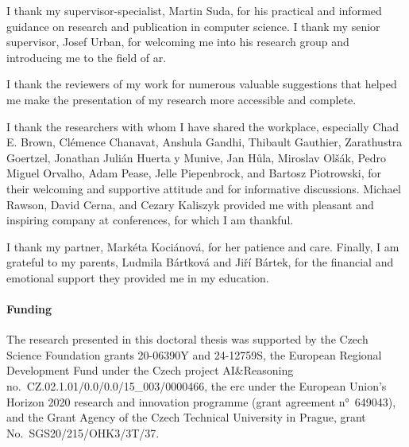\begin{thanks}
I thank my supervisor-specialist, Martin Suda, for his practical and informed guidance on research and publication in computer science.
I thank my senior supervisor, Josef Urban, for welcoming me into his research group and introducing me to the field of \gls{ar}.

I thank the reviewers of my work for numerous valuable suggestions that helped me make the presentation of my research more accessible and complete.

I thank the researchers with whom I have shared the workplace, especially
Chad E. Brown,
Clémence Chanavat,
Anshula Gandhi,
Thibault Gauthier,
Zarathustra Goertzel,
Jonathan Julián Huerta y Munive,
Jan Hůla,
Miroslav Olšák,
Pedro Miguel Orvalho,
Adam Pease,
Jelle Piepenbrock, and
Bartosz Piotrowski,
for their welcoming and supportive attitude and for informative discussions.
Michael Rawson, David Cerna, and Cezary Kaliszyk provided me with pleasant and inspiring company at conferences, for which I am thankful.

I thank my partner, Markéta Kociánová, for her patience and care.
Finally, I am grateful to my parents, Ludmila Bártková and Jiří Bártek, for the financial and emotional support they provided me in my education.

\paragraph{Funding}



The research presented in this doctoral thesis was supported by
the Czech Science Foundation grants 20-06390Y and 24-12759S,
the European Regional Development Fund under the Czech project AI\&Reasoning no.~CZ.02.1.01/0.0/0.0/15\_003/0000466,
the \gls{erc} under the European Union's Horizon 2020 research and innovation programme (grant agreement n°~649043), and
the Grant Agency of the Czech Technical University in Prague, grant No.~SGS20/215/OHK3/3T/37.
\end{thanks}

